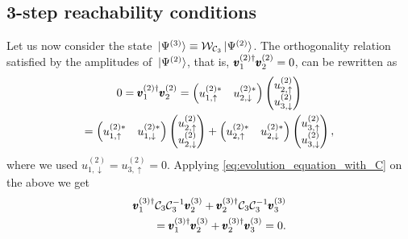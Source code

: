 \subsection{3-step reachability conditions}
\label{sec:3step_reachability}
Let us now consider the state $\ket*{\Psi^{(3)}} \equiv \mathcal W_{\mathcal C_3} \ket*{\Psi^{(2)}}$.
The orthogonality relation satisfied by the amplitudes of $\ket*{\Psi^{(2)}}$, that is,
$\pmb{v}_1^{(2)\dagger} \pmb{v}_2^{(2)} = 0$,
can be rewritten as
\begin{equation}
\begin{gathered}
	0 =
	\pmb{v}_1^{(2)\dagger} \pmb{v}_2^{(2)} = 
	\begin{pmatrix}
		u^{(2)*}_{1,\uparrow} & u^{(2)*}_{2,\downarrow}
	\end{pmatrix}
	\begin{pmatrix}
		u^{(2)}_{2,\uparrow} \\ u^{(2)}_{3,\downarrow}
	\end{pmatrix}
	\\
	=
	\begin{pmatrix}
		u^{(2)*}_{1,\uparrow} & u^{(2)*}_{1,\downarrow}
	\end{pmatrix}
	\begin{pmatrix}
		u^{(2)}_{2,\uparrow} \\ u^{(2)}_{2,\downarrow}
	\end{pmatrix}
	+
	\begin{pmatrix}
		u^{(2)*}_{2,\uparrow} & u^{(2)*}_{2,\downarrow}
	\end{pmatrix}
	\begin{pmatrix}
		u^{(2)}_{3,\uparrow} \\ u^{(2)}_{3,\downarrow}
	\end{pmatrix},
\end{gathered}
\end{equation}
where we used
$u^{(2)}_{1,\downarrow} = u^{(2)}_{3,\uparrow} = 0$.
Applying \cref{eq:evolution_equation_with_C} on the above we get
\begin{equation}
\begin{aligned}
	\pmb{v}_1^{(3)\dagger} \mathcal C_3 \mathcal C_3^{-1} \pmb{v}_2^{(3)} +
	\pmb{v}_2^{(3)\dagger} \mathcal C_3 \mathcal C_3^{-1} \pmb{v}_3^{(3)}
	\\ =
	\pmb{v}_1^{(3)\dagger} \pmb{v}_2^{(3)} +
	\pmb{v}_2^{(3)\dagger} \pmb{v}_3^{(3)} = 0.
\end{aligned}
\label{eq:last_condition_for_psi3}
\end{equation}

